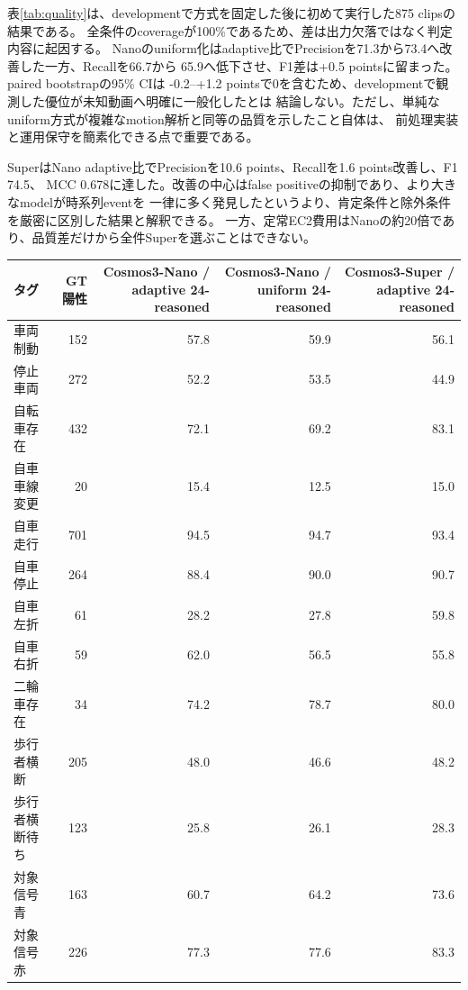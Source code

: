 \documentclass[9pt,a4paper]{extarticle}
\begin{document}
表\ref{tab:quality}は、developmentで方式を固定した後に初めて実行した875 clipsの結果である。
全条件のcoverageが100\%であるため、差は出力欠落ではなく判定内容に起因する。
Nanoのuniform化はadaptive比でPrecisionを71.3から73.4へ改善した一方、Recallを66.7から
65.9へ低下させ、F1差は+0.5 pointsに留まった。paired bootstrapの95\% CIは
-0.2--+1.2 pointsで0を含むため、developmentで観測した優位が未知動画へ明確に一般化したとは
結論しない。ただし、単純なuniform方式が複雑なmotion解析と同等の品質を示したこと自体は、
前処理実装と運用保守を簡素化できる点で重要である。

SuperはNano adaptive比でPrecisionを10.6 points、Recallを1.6 points改善し、F1 74.5、
MCC 0.678に達した。改善の中心はfalse positiveの抑制であり、より大きなmodelが時系列eventを
一律に多く発見したというより、肯定条件と除外条件を厳密に区別した結果と解釈できる。
一方、定常EC2費用はNanoの約20倍であり、品質差だけから全件Superを選ぶことはできない。

\begin{center}
\centering
{}
\label{tab:tags}
\small
\begin{tabular}{lrrrr}
\toprule
タグ & GT陽性 & Cosmos3-Nano / adaptive 24-reasoned & Cosmos3-Nano / uniform 24-reasoned & Cosmos3-Super / adaptive 24-reasoned\\
\midrule
車両制動 & 152 & 57.8 & 59.9 & 56.1 \\
停止車両 & 272 & 52.2 & 53.5 & 44.9 \\
自転車存在 & 432 & 72.1 & 69.2 & 83.1 \\
自車車線変更 & 20 & 15.4 & 12.5 & 15.0 \\
自車走行 & 701 & 94.5 & 94.7 & 93.4 \\
自車停止 & 264 & 88.4 & 90.0 & 90.7 \\
自車左折 & 61 & 28.2 & 27.8 & 59.8 \\
自車右折 & 59 & 62.0 & 56.5 & 55.8 \\
二輪車存在 & 34 & 74.2 & 78.7 & 80.0 \\
歩行者横断 & 205 & 48.0 & 46.6 & 48.2 \\
歩行者横断待ち & 123 & 25.8 & 26.1 & 28.3 \\
対象信号青 & 163 & 60.7 & 64.2 & 73.6 \\
対象信号赤 & 226 & 77.3 & 77.6 & 83.3 \\
\bottomrule
\end{tabular}
\end{center}
\end{document}
